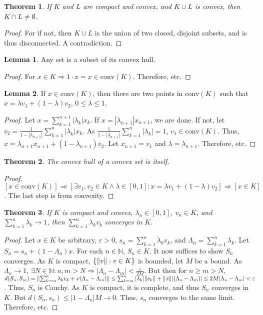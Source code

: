 \documentclass[oneside]{book}
\newtheorem{theorem}{Theorem}[section]
\theoremstyle{definition}
\newtheorem{lemma}{Lemma}[section]
\begin{document}
\begin{theorem}
If $K$ and $L$ are compact and convex, and $K\cup L$ is convex, then $K\cap L \ne \emptyset$.
\end{theorem}
\begin{proof}
For if not, then $K\cup L$ is the union of two closed, disjoint subsets, and is thus disconnected. A contradiction. 
\end{proof}

\begin{lemma}
Any set is a subset of its convex hull.
\end{lemma}
\begin{proof}
For $x\in K \Rightarrow 1\cdot x=x \in \textrm{conv}(K)$. Therefore, etc.
\end{proof}

\begin{lemma}
If $x\in \textrm{conv}(K)$, then there are two points in $\textrm{conv}(K)$ such that $x = \lambda v_1 +(1- \lambda) v_2$, $0 \leq \lambda \leq 1$.
\end{lemma}
\begin{proof}
Let $x=\sum_{k=1}^{n+1}|\lambda_k| x_k$. If $x=|\lambda_{n+1}|x_{n+1}$, we are done. If not, let $v_2 = \frac{1}{1-|\lambda_{n+1}|}\sum_{k=1}^{n}|\lambda_k|x_k$. As $\frac{1}{1-|\lambda_{n+1}|}\sum_{k=1}^{n}|\lambda_k| = 1$, $v_1\in \textrm{conv}(K)$. Thus, $x = \lambda_{n+1}x_{n+1}+(1-\lambda_{n+1})v_2$. Let $x_{n+1}=v_1$ and $\lambda = \lambda_{n+1}$. Therefore, etc.
\end{proof}

\begin{theorem}
The convex hull of a convex set is itself.
\end{theorem}
\begin{proof}
$[x\in \textrm{conv}(K)]\Rightarrow [\exists v_1,v_2\in K\land \lambda\in[0,1]:x=\lambda v_1+(1-\lambda)v_2]\Rightarrow [x\in K]$. The last step is from convexity.
\end{proof}

\begin{theorem}
If $K$ is compact and convex, $\lambda_n\in[0,1]$, $v_n\in K$, and $\sum_{k=1}^{n}\lambda_k \rightarrow 1$, then $\sum_{k=1}^{n}\lambda_k v_k$ converges in $K$.
\end{theorem}
\begin{proof}
Let $x\in K$ be arbitrary, $\varepsilon>0$, $s_n = \sum_{k=1}^{n}\lambda_k v_k$, and $\Lambda_n = \sum_{k=1}^{n}\lambda_k$. Let $S_n = s_n + (1-\Lambda_n)x$. For each $n\in \mathbb{N}$, $S_n\in K$. It now suffices to show $S_n$ converges. As $K$ is compact, $\{\norm{v}:v\in K\}$ is bounded, let $M$ be a bound. As $\Lambda_n\rightarrow 1$, $\exists N\in \mathbb{N}:n,m>N\Rightarrow |\Lambda_n-\Lambda_m|<\frac{\varepsilon}{2M}$. But then for $n\geq m >N$, $d(S_n,S_m) = \norm{\sum_{k=m}^{n}\lambda_k v_k+x(\Lambda_n-\Lambda_m)} \leq \sum_{k=m}^{n}|\lambda_k| \norm{v_k}+\norm{x}|(\Lambda_n-\Lambda_m)|\leq 2M|\Lambda_{n}-\Lambda_{m}|<\varepsilon$. Thus, $S_n$ is Cauchy. As $K$ is compact, it is complete, and thus $S_n$ converges in $K$. But $d(S_n,s_n)\leq |1-\Lambda_n|M\rightarrow 0$. Thus, $s_n$ converges to the same limit. Therefore, etc.
\end{proof}
\end{document}
